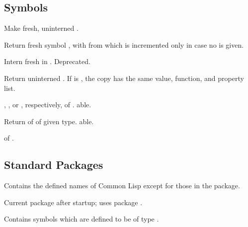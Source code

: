 \subsection{Symbols}
\begin{LIST}{1cm}

  {
  Make fresh, uninterned .
  }

  {
  Return fresh symbol , with  from
   which is incremented only in case no 
  is given. 
  }

  {
  Intern fresh  in . Deprecated.
  }

  {
  Return uninterned . If  is
  \T, the copy has the same value, function, and property list.
  }

  {
  , , or , respectively,
  of . able. 
  }

  {
  Return  of  of given
  type. able. 
  }

  {
   of .
  }

\end{LIST}


\subsection{Standard Packages}
\begin{LIST}{1cm}

  {
  Contains the defined names of Common Lisp except for those in the
   package.
  }

  {
    Current package after startup; uses package . 
  }

  {
    Contains symbols which are defined to be of type .
  }

\end{LIST}
